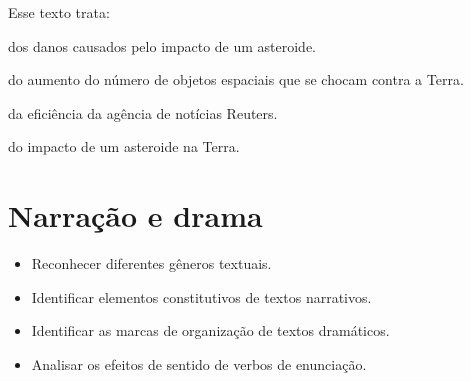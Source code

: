 Esse texto trata:

\begin{escolha}
\item dos danos causados pelo impacto de um asteroide.

\item do aumento do número de objetos espaciais que se chocam contra a Terra.

\item da eficiência da agência de notícias Reuters.

\item do impacto de um asteroide na Terra.
\end{escolha}


\chapter{Narração e drama}

\vspace*{-1\baselineskip}


\begin{itemize}
\item Reconhecer diferentes gêneros textuais.

\item Identificar elementos constitutivos de textos narrativos.

\item Identificar as marcas de organização de textos dramáticos.

\item Analisar os efeitos de sentido de verbos de enunciação.
\end{itemize}

